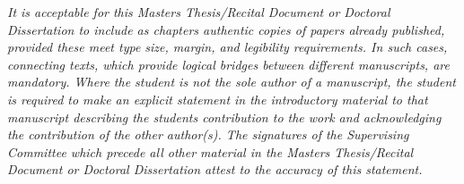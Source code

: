 \begin{acknowledgements}
\begin{singlespace}
\emph{It is acceptable for this Masters Thesis/Recital Document or
Doctoral Dissertation to include as chapters authentic copies of papers
already published, provided these meet type size, margin, and legibility
requirements. In such cases, connecting texts, which provide logical
bridges between different manuscripts, are mandatory. Where the student
is not the sole author of a manuscript, the student is required to
make an explicit statement in the introductory material to that manuscript
describing the students contribution to the work and acknowledging
the contribution of the other author(s). The signatures of the Supervising
Committee which precede all other material in the Masters Thesis/Recital
Document or Doctoral Dissertation attest to the accuracy of this statement.}\end{singlespace}
\end{acknowledgements}